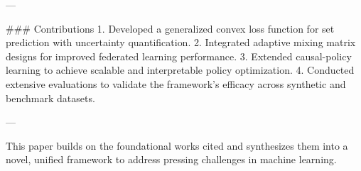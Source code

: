 ---

### Contributions
1. Developed a generalized convex loss function for set prediction with uncertainty quantification.
2. Integrated adaptive mixing matrix designs for improved federated learning performance.
3. Extended causal-policy learning to achieve scalable and interpretable policy optimization.
4. Conducted extensive evaluations to validate the framework's efficacy across synthetic and benchmark datasets.

--- 

This paper builds on the foundational works cited and synthesizes them into a novel, unified framework to address pressing challenges in machine learning.